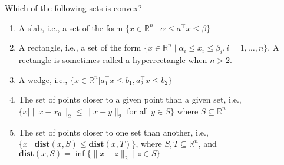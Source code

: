 \documentclass{llncs}
\begin{document}
\begin{problem}
Which of the following sets is convex?
\begin{enumerate}
    \item A slab, i.e., a set of the form $\{x \in \mathbb{R}^n \mid \alpha \le a^\top x \le \beta\}$
    \item A rectangle, i.e., a set of the form $\{ x \in \mathbb{R}^n \mid \alpha_i \le x_i \le \beta_i, i = 1, \ldots, n\}$. A rectangle is sometimes called a hyperrectangle when $n > 2$.
    \item A wedge, i.e., $\{x \in \mathbb{R}^n | a_1^\top x \le b_1, a_2^\top x \le b_2\}$
    \item The set of points closer to a given point than a given set, i.e., $\{ x \mid \|x - x_0\|_2 \le \|x - y \|_2$ for all $y \in S\}$ where $S \subseteq \mathbb{R}^n$
    \item The set of points closer to one set than another, i.e., $\{ x \mid \textbf{dist}(x, S) \le \textbf{dist}(x, T)\}$, where $S,T \subseteq \mathbb{R}^n$, and $\textbf{dist}(x,S) = \inf\{\|x - z\|_2 \mid z \in S\}$
\end{enumerate}
\end{problem}
\end{document}
